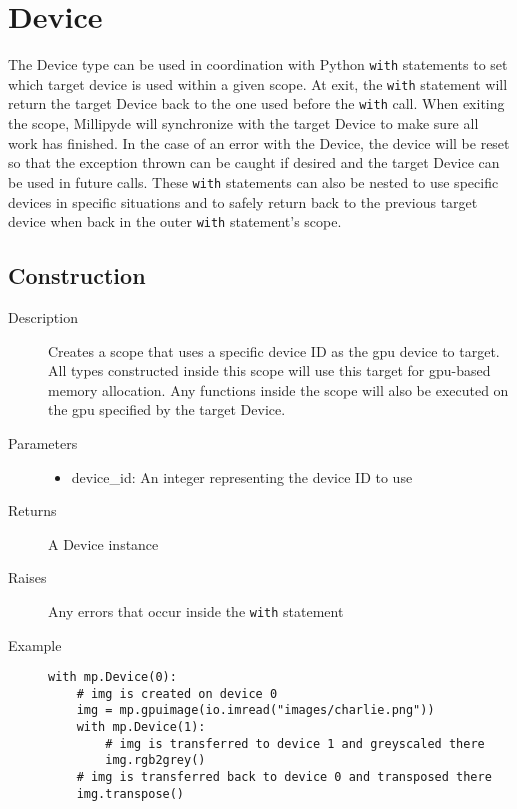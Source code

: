\section{Device}

The Device type can be used in coordination with Python \verb|with| statements to set which target device is used within a given scope. At exit, the \verb|with| statement will return the target Device back to the one used before the \verb|with| call. When exiting the scope, Millipyde will synchronize with the target Device to make sure all work has finished. In the case of an error with the Device, the device will be reset so that the exception thrown can be caught if desired and the target Device can be used in future calls. These \verb|with| statements can also be nested to use specific devices in specific situations and to safely return back to the previous target device when back in the outer \verb|with| statement's scope.

\subsection{Construction}

\begin{description}
   \item[Description] Creates a scope that uses a specific device ID as the gpu device to target. All types constructed inside this scope will use this target for gpu-based memory allocation. Any functions inside the scope will also be executed on the gpu specified by the target Device.
   \item[Parameters] \phantom{}
   \begin{itemize}
       \item device\_id: An integer representing the device ID to use
   \end{itemize}
   \item[Returns] A Device instance
   \item[Raises] Any errors that occur inside the \verb|with| statement
   \item[Example] \phantom{}
   \begin{lstlisting}
with mp.Device(0):
    # img is created on device 0
    img = mp.gpuimage(io.imread("images/charlie.png"))
    with mp.Device(1):
        # img is transferred to device 1 and greyscaled there
        img.rgb2grey()
    # img is transferred back to device 0 and transposed there
    img.transpose()
\end{lstlisting}
\end{description}

